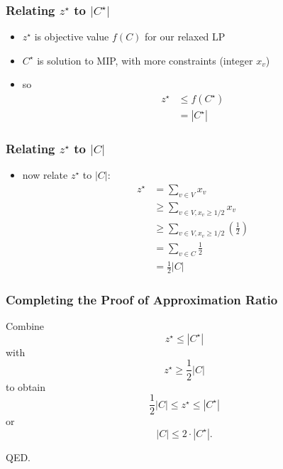 \documentclass{beamer}
\begin{document}
\begin{frame} \frametitle{Relating $z^\star$ to $|C^\star|$}
  \begin{itemize}
    \item $z^\star$ is objective value $f(C)$ for our relaxed LP
    \item $C^\star$ is solution to MIP, with more constraints (integer $x_v$)
    \item so
      \begin{align*}
        z^\star &\leq f(C^\star) \\
          &= |C^\star|
      \end{align*}
  \end{itemize}
\end{frame}

\begin{frame} \frametitle{Relating $z^\star$ to $|C|$}
  \begin{itemize}
    \item now relate $z^\star$ to $|C|:$
      \begin{align*}
        z^\star &= \sum_{v \in V} x_v \\
          &\geq \sum_{v \in V, x_v \geq 1/2} x_v \\
          &\geq \sum_{v \in V, x_v \geq 1/2} (\frac{1}{2}) \\
          &= \sum_{v \in C} \frac{1}{2} \\
          &= \frac{1}{2} |C|
      \end{align*}
\end{itemize}
\end{frame}

\begin{frame} \frametitle{Completing the Proof of Approximation Ratio}
  Combine
  \[ z^\star \leq |C^\star| \]
  with
  \[ z^\star \geq \frac{1}{2} |C| \]
  to obtain
  \[ \frac{1}{2} |C| \leq z^\star \leq |C^\star| \]
  or
  \[ |C| \leq 2 \cdot |C^\star| . \]

  QED.
\end{frame}
\end{document}
